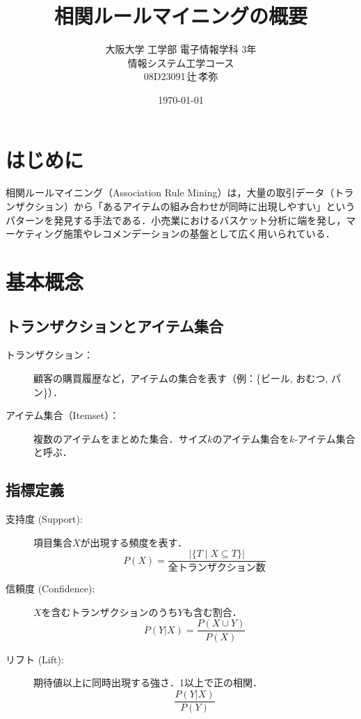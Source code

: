 \documentclass[a4j]{jsarticle}
\title{相関ルールマイニングの概要}
\author{大阪大学 工学部 電子情報学科 3年\\情報システム工学コース\\08D23091\,辻\,孝弥}
\date{\today}
\begin{document}
\maketitle

\section{はじめに}

相関ルールマイニング（Association Rule Mining）は，大量の取引データ（トランザクション）から「あるアイテムの組み合わせが同時に出現しやすい」というパターンを発見する手法である．小売業におけるバスケット分析に端を発し，マーケティング施策やレコメンデーションの基盤として広く用いられている．

\section{基本概念}

\subsection{トランザクションとアイテム集合}

\begin{description}
  \item[トランザクション：] 顧客の購買履歴など，アイテムの集合を表す（例：\{ビール, おむつ, パン\}）．
  \item[アイテム集合（Itemset）：] 複数のアイテムをまとめた集合．サイズ$k$のアイテム集合を$k$-アイテム集合と呼ぶ．
\end{description}

\subsection{指標定義}

\begin{description}
  \item[支持度 (Support):] 項目集合$X$が出現する頻度を表す．
        \[
          P(X)=\frac{|\{T \mid X \subseteq T\}|}{\text{全トランザクション数}}
        \]
  \item[信頼度 (Confidence):] $X$を含むトランザクションのうち$Y$も含む割合．
        \[
          P(Y|X)=\frac{P(X \cup Y)}{P(X)}
        \]
  \item[リフト (Lift):] 期待値以上に同時出現する強さ．1以上で正の相関．
        \[
          \frac{P(Y|X)}{P(Y)}
        \]
\end{description}
\end{document}
